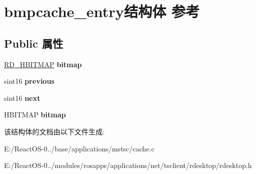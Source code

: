 \hypertarget{structbmpcache__entry}{}\section{bmpcache\+\_\+entry结构体 参考}
\label{structbmpcache__entry}
\subsection*{Public 属性}
\begin{DoxyCompactItemize}
\item 
\mbox{\label{structbmpcache__entry_a55a6f1426942a69e7d1de646e943c7a9}} 
\hyperlink{interfacevoid}{R\+D\+\_\+\+H\+B\+I\+T\+M\+AP} {\bfseries bitmap}
\item 
\mbox{\label{structbmpcache__entry_aee093a42d5ed2721bc2f45ef858307e4}} 
sint16 {\bfseries previous}
\item 
\mbox{\label{structbmpcache__entry_a21283fbec8456dba985c285c978993c8}} 
sint16 {\bfseries next}
\item 
\mbox{\label{structbmpcache__entry_a99e2e3badc3b56537079dafad39e36b9}} 
H\+B\+I\+T\+M\+AP {\bfseries bitmap}
\end{DoxyCompactItemize}


该结构体的文档由以下文件生成\+:\begin{DoxyCompactItemize}
\item 
E\+:/\+React\+O\+S-\/0../base/applications/mstsc/cache.\+c\item 
E\+:/\+React\+O\+S-\/0../modules/rosapps/applications/net/tsclient/rdesktop/rdesktop.\+h\end{DoxyCompactItemize}
